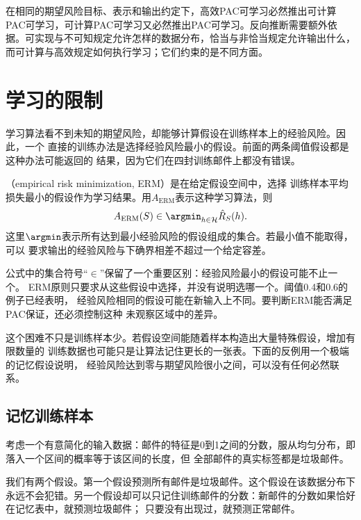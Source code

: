 在相同的期望风险目标、表示和输出约定下，高效PAC可学习必然推出可计算PAC可学习，可计算PAC可学习又必然推出PAC可学习。反向推断需要额外依据。可实现与不可知规定允许怎样的数据分布，恰当与非恰当规定允许输出什么，而可计算与高效规定如何执行学习；它们约束的是不同方面。

\section{学习的限制}
\label{sec:limits-of-learning}

学习算法看不到未知的期望风险，却能够计算假设在训练样本上的经验风险。因此，一个
直接的训练办法是选择经验风险最小的假设。前面的两条阈值假设都是这种办法可能返回的
结果，因为它们在四封训练邮件上都没有错误。

\begin{definition}[经验风险最小化]
\label{def:erm-learning-rule}
（empirical risk minimization, ERM）是在给定假设空间中，选择
训练样本平均损失最小的假设作为学习结果。用$A_{\mathrm{ERM}}$表示这种学习算法，则
\begin{equation}
 A_{\mathrm{ERM}}(S)\in\argmin_{h\in\mathcal H}\hat R_S(h).
 \label{eq:erm-learning-rule}
\end{equation}
这里$\argmin$表示所有达到最小经验风险的假设组成的集合。若最小值不能取得，可以
要求输出的经验风险与下确界相差不超过一个给定容差。
\end{definition}

公式中的集合符号“$\in$”保留了一个重要区别：经验风险最小的假设可能不止一个。
ERM原则只要求从这些假设中选择，并没有说明选哪一个。阈值0.4和0.6的例子已经表明，
经验风险相同的假设可能在新输入上不同。要判断ERM能否满足PAC保证，还必须控制这种
未观察区域中的差异。

这个困难不只是训练样本少。若假设空间能随着样本构造出大量特殊假设，增加有限数量的
训练数据也可能只是让算法记住更长的一张表。下面的反例用一个极端的记忆假设说明，
经验风险达到零与期望风险很小之间，可以没有任何必然联系。

\subsection{记忆训练样本}

考虑一个有意简化的输入数据：邮件的特征是0到1之间的分数，服从均匀分布，即落入一个区间的概率等于该区间的长度，但
全部邮件的真实标签都是垃圾邮件。

我们有两个假设。第一个假设预测所有邮件是垃圾邮件。这个假设在该数据分布下永远不会犯错。另一个假设却可以只记住训练邮件的分数：新邮件的分数如果恰好在记忆表中，就预测垃圾邮件；
只要没有出现过，就预测正常邮件。

